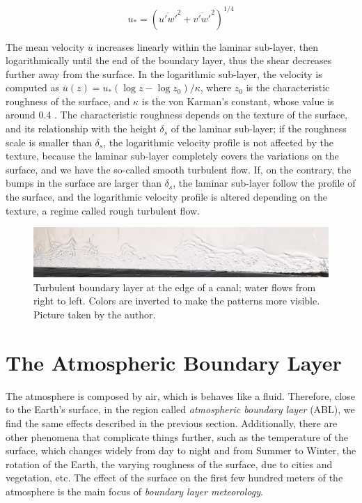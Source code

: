 \documentclass[a4paper,11pt]{kth-mag}
\begin{document}
\begin{equation}
\label{eq:ustar_momentum}
u_*=\left(\overline{u'w'}^2+\overline{v'w'}^2\right)^{1/4}
\end{equation}

The mean velocity $\overline{u}$ increases linearly within the laminar sub-layer, then logarithmically until the end of the boundary layer, thus the shear decreases further away from the surface. In the logarithmic sub-layer, the velocity is computed as $\overline{u}(z)=u_*(\log z - \log z_0)/\kappa$, where $z_0$ is the characteristic roughness of the surface, and $\kappa$ is the von Karman's constant, whose value is around 0.4 \cite{basicatm}. The characteristic roughness depends on the texture of the surface, and its relationship with the height $\delta_s$ of the laminar sub-layer; if the roughness scale is smaller than $\delta_s$, the logarithmic velocity profile is not affected by the texture, because the laminar sub-layer completely covers the variations on the surface, and we have the so-called smooth turbulent flow. If, on the contrary, the bumps in the surface are larger than $\delta_s$, the laminar sub-layer follow the profile of the surface, and the logarithmic velocity profile is altered depending on the texture, a regime called rough turbulent flow.

\begin{figure}
\caption{Turbulent boundary layer at the edge of a canal; water flows from right to left. Colors are inverted to make the patterns more visible. Picture taken by the author.}
\label{fig:bl}
\centering
\includegraphics[width=\textwidth]{images/bl}
\end{figure}

\section{The Atmospheric Boundary Layer}
\label{sec:abl}
The atmosphere is composed by air, which is behaves like a fluid. Therefore, close to the Earth's surface, in the region called \emph{atmospheric boundary layer} (ABL), we find the same effects described in the previous section. Additionally, there are other phenomena that complicate things further, such as the temperature of the surface, which changes widely from day to night and from Summer to Winter, the rotation of the Earth, the varying roughness of the surface, due to cities and vegetation, etc. The effect of the surface on the first few hundred meters of the atmosphere is the main focus of \emph{boundary layer meteorology}. 
\end{document}
